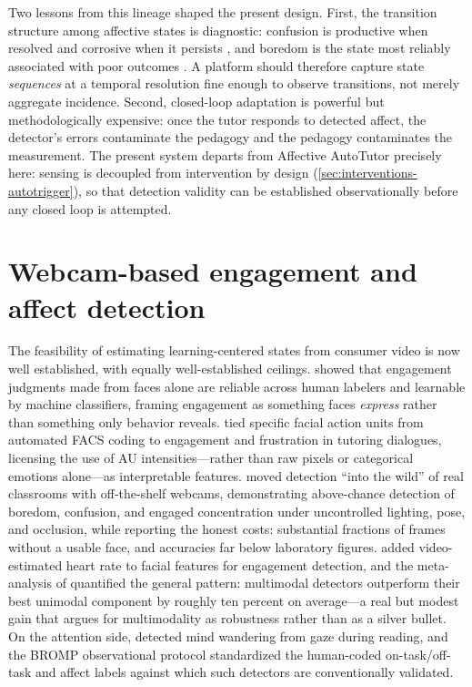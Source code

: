 Two lessons from this lineage shaped the present design. First, the
transition structure among affective states is diagnostic: confusion is
productive when resolved and corrosive when it persists
\citep{dmello2012dynamics, dmello2014confusion}, and boredom is the state
most reliably associated with poor outcomes \citep{baker2010better}. A
platform should therefore capture state \emph{sequences} at a temporal
resolution fine enough to observe transitions, not merely aggregate
incidence. Second, closed-loop adaptation is powerful but methodologically
expensive: once the tutor responds to detected affect, the detector's
errors contaminate the pedagogy and the pedagogy contaminates the
measurement. The present system departs from Affective AutoTutor precisely
here: sensing is decoupled from intervention by design
(\cref{sec:interventions-autotrigger}), so that detection validity can be
established observationally before any closed loop is attempted.

\section{Webcam-based engagement and affect detection}
\label{sec:bg-webcam}

The feasibility of estimating learning-centered states from consumer
video is now well established, with equally well-established ceilings.
\citet{whitehill2014} showed that engagement judgments made from faces
alone are reliable across human labelers and learnable by machine
classifiers, framing engagement as something faces \emph{express} rather
than something only behavior reveals. \citet{grafsgaard2013} tied specific
facial action units from automated FACS coding \citep{ekman1978} to
engagement and frustration in tutoring dialogues, licensing the use of AU
intensities---rather than raw pixels or categorical emotions alone---as
interpretable features. \citet{bosch2015, bosch2016} moved detection
``into the wild'' of real classrooms with off-the-shelf webcams,
demonstrating above-chance detection of boredom, confusion, and engaged
concentration under uncontrolled lighting, pose, and occlusion, while
reporting the honest costs: substantial fractions of frames without a
usable face, and accuracies far below laboratory figures.
\citet{monkaresi2017} added video-estimated heart rate to facial features
for engagement detection, and the meta-analysis of
\citet{dmello2015review} quantified the general pattern: multimodal
detectors outperform their best unimodal component by roughly ten percent
on average---a real but modest gain that argues for multimodality as
robustness rather than as a silver bullet. On the attention side,
\citet{bixler2016} detected mind wandering from gaze during reading, and
the BROMP observational protocol \citep{ocumpaugh2015} standardized the
human-coded on-task/off-task and affect labels against which such
detectors are conventionally validated.

